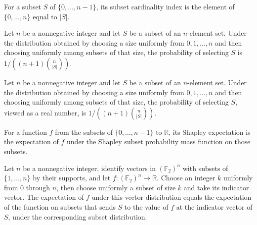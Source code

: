 \begin{definition}
\label{FABL.subsetCardIndex}
\leanok
For a subset $S$ of $\{0,\ldots,n-1\}$, its subset cardinality index is the element of
$\{0,\ldots,n\}$ equal to $|S|$.
\end{definition}

\begin{theorem}
\label{FABL.shapleySubsetPMF_apply}
\leanok
{}
Let $n$ be a nonnegative integer and let $S$ be a subset of an $n$-element set. Under
the distribution obtained by choosing a size uniformly from $0,1,\ldots,n$ and then
choosing uniformly among subsets of that size, the probability of selecting $S$ is
$1/((n+1)\binom{n}{|S|})$.
\end{theorem}

\begin{theorem}
\label{FABL.shapleySubsetPMF_apply_toReal}
\leanok
{}
Let $n$ be a nonnegative integer and let $S$ be a subset of an $n$-element set. Under
the distribution obtained by choosing a size uniformly from $0,1,\ldots,n$ and then
choosing uniformly among subsets of that size, the probability of selecting $S$, viewed
as a real number, is $1/((n+1)\binom{n}{|S|})$.
\end{theorem}

\begin{definition}
\label{FABL.shapleyExpectation}
\leanok
{}
For a function $f$ from the subsets of $\{0,\ldots,n-1\}$ to $\mathbb R$, its Shapley
expectation is the expectation of $f$ under the Shapley subset probability mass function
on those subsets.
\end{definition}

\begin{theorem}
\leanok
{}
Let $n$ be a nonnegative integer, identify vectors in $(\mathbb{F}_2)^n$ with subsets of
$\{1,\ldots,n\}$ by their supports, and let $f:(\mathbb{F}_2)^n\to\mathbb{R}$. Choose an
integer $k$ uniformly from $0$ through $n$, then choose uniformly a subset of size $k$
and take its indicator vector. The expectation of $f$ under this vector distribution
equals the expectation of the function on subsets that sends $S$ to the value of $f$ at
the indicator vector of $S$, under the corresponding subset distribution.
\end{theorem}

